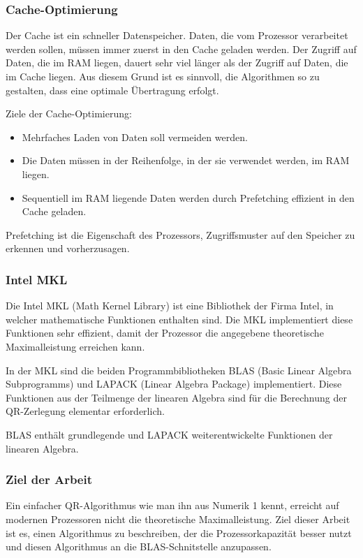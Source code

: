 \subsubsection{Cache-Optimierung}
Der Cache ist ein schneller Datenspeicher. Daten, die vom Prozessor verarbeitet werden sollen, müssen immer zuerst in den Cache geladen werden.
Der Zugriff auf Daten, die im RAM liegen, dauert sehr viel länger als der Zugriff auf Daten, die im Cache liegen.
Aus diesem Grund ist es sinnvoll, die Algorithmen so zu gestalten, dass eine optimale Übertragung erfolgt.

Ziele der Cache-Optimierung:
\begin{itemize}
	\item Mehrfaches Laden von Daten soll vermeiden werden.
	\item Die Daten müssen in der Reihenfolge, in der sie verwendet werden, im RAM liegen.
	\item Sequentiell im RAM liegende Daten werden durch Prefetching effizient in den Cache geladen.
\end{itemize}

Prefetching ist die Eigenschaft des Prozessors, Zugriffsmuster auf den Speicher zu erkennen und vorherzusagen.	

\subsubsection{Intel MKL}
Die Intel MKL (Math Kernel Library) \cite{mkl} ist eine Bibliothek der Firma Intel, in welcher mathematische Funktionen enthalten sind.
Die MKL implementiert diese Funktionen sehr effizient, damit der Prozessor die angegebene theoretische Maximalleistung erreichen kann.



In der MKL sind die beiden Programmbibliotheken BLAS (Basic Linear Algebra Subprogramms) und LAPACK (Linear Algebra Package) implementiert. 
Diese Funktionen aus der Teilmenge der linearen Algebra sind für die Berechnung der QR-Zerlegung elementar erforderlich.

BLAS enthält grundlegende und LAPACK weiterentwickelte Funktionen der linearen Algebra.

\subsubsection{Ziel der Arbeit}
Ein einfacher QR-Algorithmus wie man ihn aus Numerik 1 kennt, erreicht auf modernen Prozessoren nicht die theoretische Maximalleistung. 
Ziel dieser Arbeit ist es, einen Algorithmus zu beschreiben, der die Prozessorkapazität besser nutzt und diesen Algorithmus an die BLAS-Schnitstelle anzupassen.








